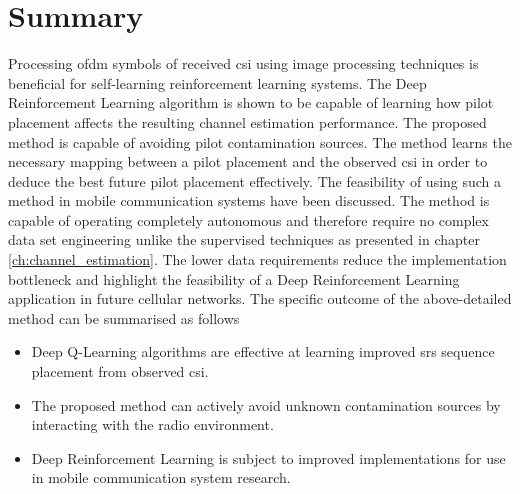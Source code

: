 \section{Summary}\label{sec:RL_summary}
Processing \gls{ofdm} symbols of received \gls{csi} using image processing techniques is beneficial for self-learning reinforcement learning systems. The Deep Reinforcement Learning algorithm is shown to be capable of learning how pilot placement affects the resulting channel estimation performance. The proposed method is capable of avoiding pilot contamination sources. The method learns the necessary mapping between a pilot placement and the observed \gls{csi} in order to deduce the best future pilot placement effectively. The feasibility of using such a method in mobile communication systems have been discussed. The method is capable of operating completely autonomous and therefore require no complex data set engineering unlike the supervised techniques as presented in chapter \ref{ch:channel_estimation}. The lower data requirements reduce the implementation bottleneck and highlight the feasibility of a Deep Reinforcement Learning application in future cellular networks. The specific outcome of the above-detailed method can be summarised as follows

\begin{itemize}
    \item Deep Q-Learning algorithms are effective at learning improved \gls{srs} sequence placement from observed \gls{csi}. 
    \item The proposed method can actively avoid unknown contamination sources by interacting with the radio environment. 
    \item Deep Reinforcement Learning is subject to improved implementations for use in mobile communication system research. 
\end{itemize}

